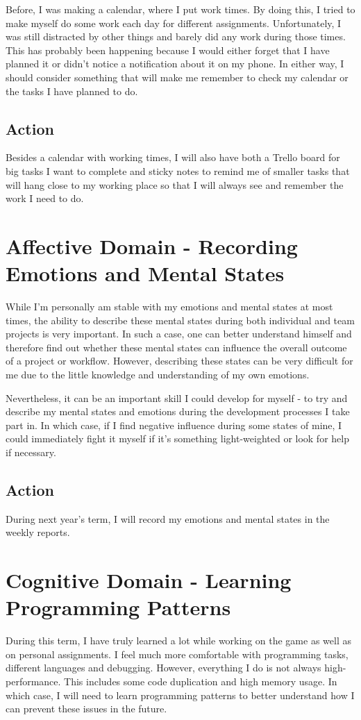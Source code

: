 \documentclass{scrartcl}
\begin{document}
Before, I was making a calendar, where I put work times. By doing this, I tried to make myself do some work each day for different assignments. Unfortunately, I was still distracted by other things and barely did any work during those times. This has probably been happening because I would either forget that I have planned it or didn't notice a notification about it on my phone. In either way, I should consider something that will make me remember to check my calendar or the tasks I have planned to do.

\subsection{Action}
Besides a calendar with working times, I will also have both a Trello board for big tasks I want to complete and sticky notes to remind me of smaller tasks that will hang close to my working place so that I will always see and remember the work I need to do.

\section{Affective Domain - Recording Emotions and Mental States}
While I'm personally am stable with my emotions and mental states at most times, the ability to describe these mental states during both individual and team projects is very important. In such a case, one can better understand himself and therefore find out whether these mental states can influence the overall outcome of a project or workflow. However, describing these states can be very difficult for me due to the little knowledge and understanding of my own emotions.

Nevertheless, it can be an important skill I could develop for myself - to try and describe my mental states and emotions during the development processes I take part in. In which case, if I find negative influence during some states of mine, I could immediately fight it myself if it's something light-weighted or look for help if necessary.

\subsection{Action}
During next year's term, I will record my emotions and mental states in the weekly reports.

\section{Cognitive Domain - Learning Programming Patterns}
During this term, I have truly learned a lot while working on the game as well as on personal assignments. I feel much more comfortable with programming tasks, different languages and debugging. However, everything I do is not always high-performance. This includes some code duplication and high memory usage. In which case, I will need to learn programming patterns to better understand how I can prevent these issues in the future.
\end{document}
